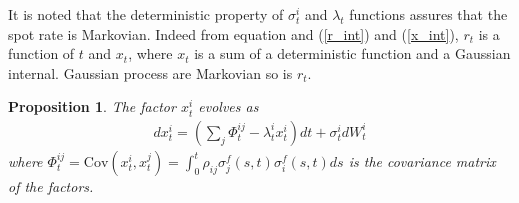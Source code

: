 \documentclass[10pt]{article}
\theoremstyle{plain}
\newtheorem{prop}{Proposition}[section]
\numberwithin{equation}{section}
\numberwithin{table}{section}
\begin{document}
It is noted that the deterministic property of $\sigma_{t}^i$ and $
\lambda_{t}$ functions assures that the spot rate is Markovian. Indeed from
equation and (\ref{r_int}) and (\ref{x_int}), $r_{t}$ is a function of $t$
and $x_{t}$, where $x_{t}$ is a sum of a deterministic function and a
Gaussian internal. Gaussian process are Markovian so is $r_{t}$.


\begin{prop}
    The factor $x_{t}^i$ evolves as 
    \begin{eqnarray}
        dx^i_{t} = \left(\sum_{j}\Phi_{t}^{ij}-\lambda_{t}^ix_{t}^i \right)dt+
        \sigma_{t}^i dW_{t}^{i}  \label{x_SDE}
    \end{eqnarray}
    where $\Phi^{ij}_{t}= \mathrm{Cov}(x_{t}^i, x_{t}^j) =
    \int_{0}^t\rho_{ij}\sigma^f_{j}(s,t)\sigma_{i}^f(s,t)ds$ is the covariance
    matrix of the factors.
\end{prop}
\end{document}
